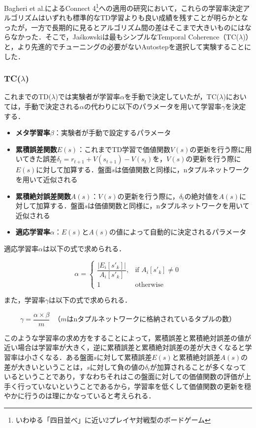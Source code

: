 \documentclass{suribt}
\begin{document}
Bagheri et al.によるConnect 4\footnote{いわゆる「四目並べ」に近い2プレイヤ対戦型のボードゲーム}への適用の研究において，これらの学習率決定アルゴリズムはいずれも標準的なTD学習よりも良い成績を残すことが明らかとなったが\cite{Bagheri}，一方で長期的に見るとアルゴリズム間の差はそこまで大きいものにはならなかった．そこで，Ja\'{s}kowskiは最もシンプルなTemporal Coherence（TC(${\lambda}$)）と，より先進的でチューニングの必要がないAutostepを選択して実験することにした．

\subsubsection{TC(${\lambda}$)}
これまでのTD(${\lambda}$)では実験者が学習率${\alpha}$を手動で決定していたが，TC(${\lambda}$)においては，手動で決定される${\alpha}$の代わりに以下のパラメータを用いて学習率${\gamma}$を決定する．

\begin{itemize}
\item \textbf{メタ学習率${\beta}$}：実験者が手動で設定するパラメータ
\item \textbf{累積誤差関数$E(s)$}：これまでTD学習で価値関数$V(s)$の更新を行う際に用いてきた誤差${\delta}_t = r_{t+1} + V(s_{t+1}) - V(s_t)$を，$V(s)$の更新を行う際に$E(s)$に対して加算する．盤面$s$は価値関数と同様に，nタプルネットワークを用いて近似される
\item \textbf{累積絶対誤差関数$A(s)$}：$V(s)$の更新を行う際に，${\delta}_t$の絶対値を$A(s)$に対して加算する．盤面$s$は価値関数と同様に，nタプルネットワークを用いて近似される
\item \textbf{適応学習率${\alpha}$}：$E(s)$と$A(s)$の値によって自動的に決定されるパラメータ
\end{itemize}

適応学習率${\alpha}$は以下の式で求められる．

\[
{\alpha} = 
\begin{cases}
\dfrac{|E_i[s'_k]|}{A_i[s'_k]}, & \text{if $A_i[s'_k] \neq 0$} \\
1 & \text{otherwise}
\end{cases}
\]

また，学習率${\gamma}$は以下の式で求められる．

\[
{\gamma} = \dfrac{{\alpha} \times {\beta}}{m} \;\; \text{（$m$はnタプルネットワークに格納されているタプルの数）}
\]

このような学習率の求め方をすることによって，累積誤差と累積絶対誤差の値が近い場合は学習率が大きく，逆に累積誤差と累積絶対誤差の差が大きくなると学習率は小さくなる．ある盤面$s$に対して累積誤差$E(s)$と累積絶対誤差$A(s)$の差が大きいということは，$s$に対して負の値の${\delta}_t$が加算されることが多くなっているということであり，すなわちそれはこの盤面に対しての価値関数の評価が上手く行っていないということであるから，学習率を低くして価値関数の更新を穏やかに行うのは理にかなっていると考えられる．
\end{document}
